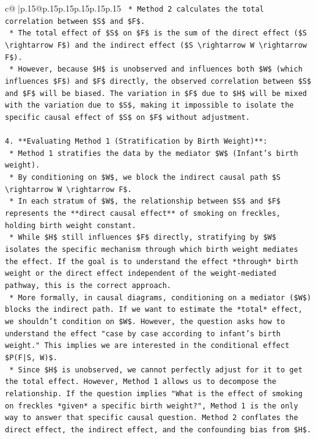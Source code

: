 \documentclass{article}
\begin{document}
{\begin{supertabular}{c@{$\;$}|p{.15\linewidth}@{}p{.15\linewidth}p{.15\linewidth}p{.15\linewidth}p{.15\linewidth}p{.15\linewidth}}
{{{\texttt{    *   Method 2 calculates the total correlation between \$S\$ and \$F\$.} \\
\texttt{    *   The total effect of \$S\$ on \$F\$ is the sum of the direct effect (\$S \textbackslash{}rightarrow F\$) and the indirect effect (\$S \textbackslash{}rightarrow W \textbackslash{}rightarrow F\$).} \\
\texttt{    *   However, because \$H\$ is unobserved and influences both \$W\$ (which influences \$F\$) and \$F\$ directly, the observed correlation between \$S\$ and \$F\$ will be biased. The variation in \$F\$ due to \$H\$ will be mixed with the variation due to \$S\$, making it impossible to isolate the specific causal effect of \$S\$ on \$F\$ without adjustment.} \\
\\ 
\texttt{4.  **Evaluating Method 1 (Stratification by Birth Weight)**:} \\
\texttt{    *   Method 1 stratifies the data by the mediator \$W\$ (Infant's birth weight).} \\
\texttt{    *   By conditioning on \$W\$, we block the indirect causal path \$S \textbackslash{}rightarrow W \textbackslash{}rightarrow F\$.} \\
\texttt{    *   In each stratum of \$W\$, the relationship between \$S\$ and \$F\$ represents the **direct causal effect** of smoking on freckles, holding birth weight constant.} \\
\texttt{    *   While \$H\$ still influences \$F\$ directly, stratifying by \$W\$ isolates the specific mechanism through which birth weight mediates the effect. If the goal is to understand the effect *through* birth weight or the direct effect independent of the weight{-}mediated pathway, this is the correct approach.} \\
\texttt{    *   More formally, in causal diagrams, conditioning on a mediator (\$W\$) blocks the indirect path. If we want to estimate the *total* effect, we shouldn't condition on \$W\$. However, the question asks how to understand the effect "case by case according to infant's birth weight." This implies we are interested in the conditional effect \$P(F|S, W)\$.} \\
\texttt{    *   Since \$H\$ is unobserved, we cannot perfectly adjust for it to get the total effect. However, Method 1 allows us to decompose the relationship. If the question implies "What is the effect of smoking on freckles *given* a specific birth weight?", Method 1 is the only way to answer that specific causal question. Method 2 conflates the direct effect, the indirect effect, and the confounding bias from \$H\$.} \\
}}}
\end{supertabular}}
\end{document}
